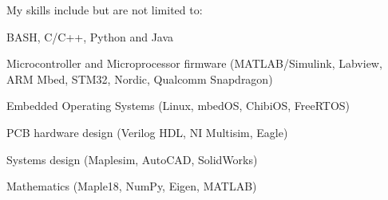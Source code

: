 
\begin{cvparagraph}

My skills include but are not limited to:
\newline
\begin{cvitems}
  \item BASH, C/C++, Python and Java
  \item Microcontroller and Microprocessor firmware (MATLAB/Simulink, Labview, ARM Mbed, STM32, Nordic, Qualcomm Snapdragon)
  \item Embedded Operating Systems (Linux, mbedOS, ChibiOS, FreeRTOS)
  \item PCB hardware design (Verilog HDL, NI Multisim, Eagle)
  \item Systems design (Maplesim, AutoCAD, SolidWorks)
  \item Mathematics (Maple18, NumPy, Eigen, MATLAB)
\end{cvitems}
\end{cvparagraph}
